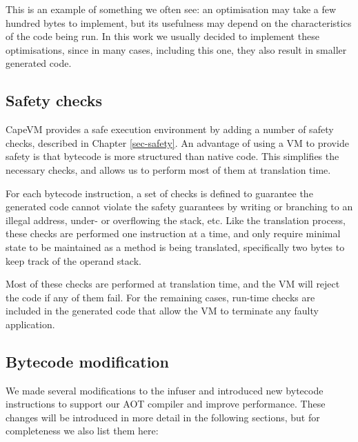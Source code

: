 This is an example of something we often see: an optimisation may take a few hundred bytes to implement, but its usefulness may depend on the characteristics of the code being run. In this work we usually decided to implement these optimisations, since in many cases, including this one, they also result in smaller generated code.


\subsection{Safety checks}
CapeVM provides a safe execution environment by adding a number of safety checks, described in Chapter \ref{sec-safety}. An advantage of using a VM to provide safety is that bytecode is more structured than native code. This simplifies the necessary checks, and allows us to perform most of them at translation time.

For each bytecode instruction, a set of checks is defined to guarantee the generated code cannot violate the safety guarantees by writing or branching to an illegal address, under- or overflowing the stack, etc. Like the translation process, these checks are performed one instruction at a time, and only require minimal state to be maintained as a method is being translated, specifically two bytes to keep track of the operand stack.

Most of these checks are performed at translation time, and the VM will reject the code if any of them fail. For the remaining cases, run-time checks are included in the generated code that allow the VM to terminate any faulty application.


\subsection{Bytecode modification}
\label{sec-vm-design-bytecode-modifications}
We made several modifications to the infuser and introduced new bytecode instructions to support our AOT compiler and improve performance. These changes will be introduced in more detail in the following sections, but for completeness we also list them here:

